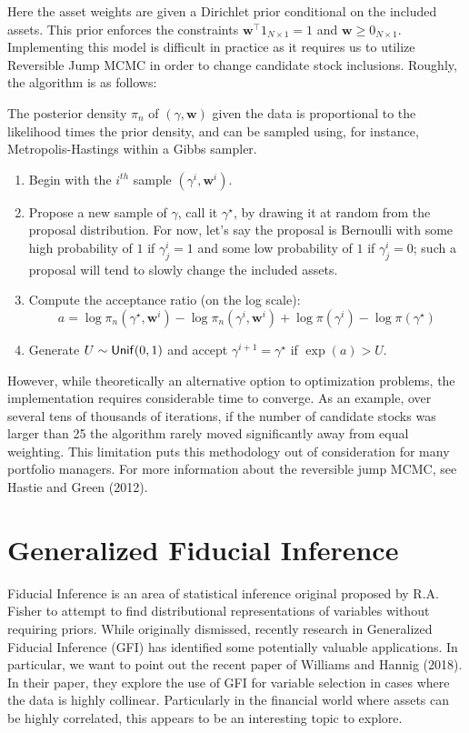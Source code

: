 \documentclass[a4paper, 12pt]{article}
\theoremstyle{plain}
\theoremstyle{definition}
\theoremstyle{remark}
\newcommand{\unif}{{\sf Unif}}
\begin{document}
Here the asset weights are given a Dirichlet prior conditional on the included assets.  This prior enforces the constraints $\textbf{w}^\top 1_{N\times 1}=1$ and $\textbf{w}\geq 0_{N\times 1}$. Implementing this model is difficult in practice as it requires us to utilize Reversible Jump MCMC in order to change candidate stock inclusions. Roughly, the algorithm is as follows:

The posterior density $\pi_n$ of $(\gamma, \textbf{w})$ given the data is proportional to the likelihood times the prior density, and can be sampled using, for instance, Metropolis-Hastings within a Gibbs sampler.

\begin{enumerate}
	\item Begin with the $i^{th}$ sample $(\gamma^i, \textbf{w}^i)$.
	\item Propose a new sample of $\gamma$, call it $\gamma^\star$, by drawing it at random from the proposal distribution.  For now, let's say the proposal is Bernoulli with some high probability of $1$ if $\gamma^i_j =1$ and some low probability of $1$ if $\gamma^i_j =0$; such a proposal will tend to slowly change the included assets.
	\item Compute the acceptance ratio (on the log scale):
	\[a=\log \pi_n(\gamma^\star, \textbf{w}^i) - \log \pi_n(\gamma^i, \textbf{w}^i) + \log \pi(\gamma^i) - \log \pi(\gamma^\star)\]
	\item Generate $U\sim \unif(0,1)$ and accept $\gamma^{i+1}=\gamma^\star$ if $\exp(a)>U$.  
\end{enumerate}

However, while theoretically an alternative option to optimization problems, the implementation requires considerable time to converge. As an example, over several tens of thousands of iterations, if the number of candidate stocks was larger than 25 the algorithm rarely moved significantly away from equal weighting. This limitation puts this methodology out of consideration for many portfolio managers.
For more information about the reversible jump MCMC, see Hastie and Green (2012).

\section{Generalized Fiducial Inference}
Fiducial Inference is an area of statistical inference original proposed by R.A. Fisher to attempt to find distributional representations of variables without requiring priors. While originally dismissed, recently research in Generalized Fiducial Inference (GFI) has identified some potentially valuable applications. In particular, we want to point out the recent paper of Williams and Hannig (2018). In their paper, they explore the use of GFI for variable selection in cases where the data is highly collinear. Particularly in the financial world where assets can be highly correlated, this appears to be an interesting topic to explore.
\end{document}
